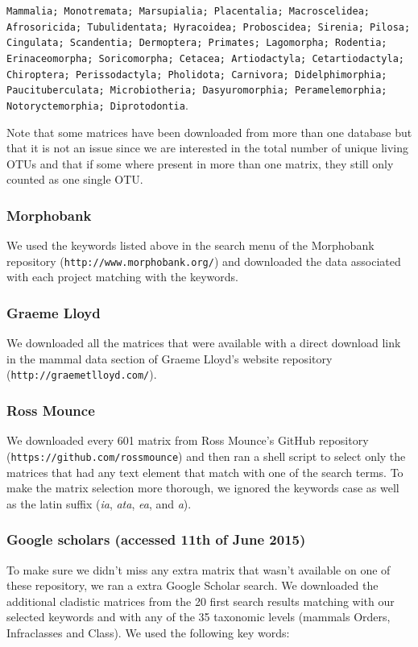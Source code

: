 \texttt{Mammalia; Monotremata; Marsupialia; Placentalia; Macroscelidea; Afrosoricida; Tubulidentata; Hyracoidea; Proboscidea; Sirenia; Pilosa; Cingulata; Scandentia; Dermoptera; Primates; Lagomorpha; Rodentia; Erinaceomorpha; Soricomorpha; Cetacea; Artiodactyla; Cetartiodactyla; Chiroptera; Perissodactyla; Pholidota; Carnivora; Didelphimorphia; Paucituberculata; Microbiotheria; Dasyuromorphia; Peramelemorphia; Notoryctemorphia; Diprotodontia}.

Note that some matrices have been downloaded from more than one database but that it is not an issue since we are interested in the total number of unique living OTUs and that if some where present in more than one matrix, they still only counted as one single OTU.

\subsubsection{Morphobank}
We used the keywords listed above in the search menu of the Morphobank repository (\texttt{http://www.morphobank.org/}) and downloaded the data associated with each project matching with the keywords.

\subsubsection{Graeme Lloyd}
We downloaded all the matrices that were available with a direct download link in the mammal data section of Graeme Lloyd's website repository (\texttt{http://graemetlloyd.com/}).

\subsubsection{Ross Mounce}
We downloaded every 601 matrix from Ross Mounce's GitHub repository (\texttt{https://github.com/rossmounce}) and then ran a shell script to select only the matrices that had any text element that match with one of the search terms.
To make the matrix selection more thorough, we ignored the keywords case as well as the latin suffix (\textit{ia}, \textit{ata}, \textit{ea}, and \textit{a}).

\subsubsection{Google scholars (accessed 11th of June 2015)}
To make sure we didn't miss any extra matrix that wasn't available on one of these repository, we ran a extra Google Scholar search. 
We downloaded the additional cladistic matrices from the 20 first search results matching with our selected keywords and with any of the 35 taxonomic levels (mammals Orders, Infraclasses and Class).
We used the following key words:

